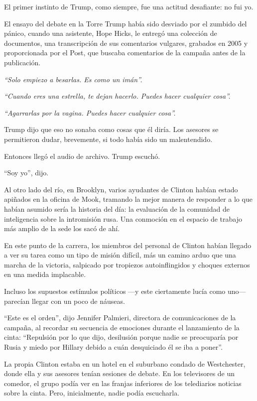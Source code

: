 El primer instinto de Trump, como siempre, fue una actitud desafiante:
no fui yo.

El ensayo del debate en la Torre Trump había sido desviado por el
zumbido del pánico, cuando una asistente, Hope Hicks, le entregó una
colección de documentos, una transcripción de sus comentarios vulgares,
grabados en 2005 y proporcionada por el Post, que buscaba comentarios de
la campaña antes de la publicación.

\emph{``Solo empiezo a besarlas. Es como un imán''.}

\emph{``Cuando eres una estrella, te dejan hacerlo. Puedes hacer
cualquier cosa''.}

\emph{``Agarrarlas por la vagina. Puedes hacer cualquier cosa''.}

Trump dijo que eso no sonaba como cosas que él diría. Los asesores se
permitieron dudar, brevemente, si todo había sido un malentendido.

Entonces llegó el audio de archivo. Trump escuchó.

``Soy yo'', dijo.

Al otro lado del río, en Brooklyn, varios ayudantes de Clinton habían
estado apiñados en la oficina de Mook, tramando la mejor manera de
responder a lo que habían asumido sería la historia del día: la
evaluación de la comunidad de inteligencia sobre la intromisión rusa.
Una conmoción en el espacio de trabajo más amplio de la sede los sacó de
ahí.

En este punto de la carrera, los miembros del personal de Clinton habían
llegado a ver su tarea como un tipo de misión difícil, más un camino
arduo que una marcha de la victoria, salpicado por tropiezos
autoinflingidos y choques externos en una medida implacable.

Incluso los supuestos estímulos políticos ---y este ciertamente lucía
como uno--- parecían llegar con un poco de náuseas.

``Este es el orden'', dijo Jennifer Palmieri, directora de
comunicaciones de la campaña, al recordar su secuencia de emociones
durante el lanzamiento de la cinta: ``Repulsión por lo que dijo,
desilusión porque nadie se preocuparía por Rusia y miedo por Hillary
debido a cuán desquiciado él se iba a poner''.

La propia Clinton estaba en un hotel en el suburbano condado de
Westchester, donde ella y sus asesores tenían sesiones de debate. En los
televisores de un comedor, el grupo podía ver en las franjas inferiores
de los telediarios noticias sobre la cinta. Pero, inicialmente, nadie
podía escucharla.

